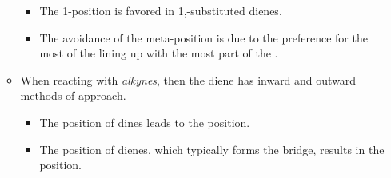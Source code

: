 \begin{itemize}
\begin{itemize}
\begin{itemize}
          \item The 1-position is favored in 1,-substituted dienes.
          \item The avoidance of the meta-position is due to the preference for the most  of the  lining up with the most  part of the .
        \end{itemize}
      \item When reacting with \emph{alkynes}, then the diene has inward and outward methods of approach.
        \begin{itemize}
          \item The  position of dines leads to the  position.
          \item The  position of dienes, which typically forms the bridge, results in the  position. 
        \end{itemize}
  \end{itemize}
\end{itemize}
